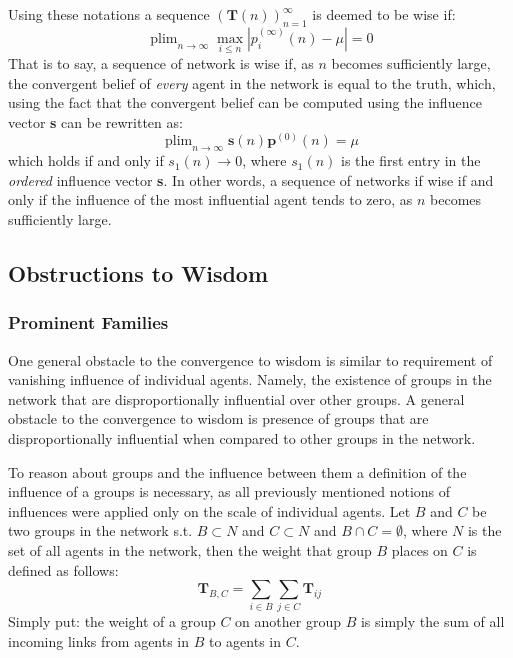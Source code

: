 \documentclass{article}
\DeclareMathOperator*{\plim}{plim}
\newcommand{\T}{\textbf{T}}
\newcommand{\Tij}{\textbf{T}_{ij}}
\newcommand{\Soc}{(\T(n))^{\infty}_{n=1}}
\newcommand{\beli}[3][2]{p_{#2}^{(#3)}}
\begin{document}
Using these notations a sequence $\Soc$ is deemed to be wise if:
\begin{equation}
    \label{wisdom:equation}
    \plim_{n\to\infty}\max_{i \leq n}|\beli{i}{\infty}(n) - \mu| = 0
\end{equation}
That is to say, a sequence of network is wise if, as $n$ becomes sufficiently large, the convergent belief of \emph{every} agent in the network is equal to the truth, which, using the fact that the convergent belief can be computed using the influence vector \textbf{s} can be rewritten as:
\begin{equation}
    \label{wisdom:influence}
    \plim_{n\to\infty} \textbf{s}(n)\textbf{p}^{(0)}(n) = \mu
\end{equation}
which holds if and only if $s_{1}(n) \to 0$, where $s_1(n)$ is the first entry in the \emph{ordered} influence vector \textbf{s}. In other words, a sequence of networks if wise if and only if the influence of the most influential agent tends to zero, as $n$ becomes sufficiently large.

\newpage

\subsection{Obstructions to Wisdom}

\subsubsection{Prominent Families}

One general obstacle to the convergence to wisdom is similar to requirement of vanishing influence of individual agents. Namely, the existence of groups in the network that are disproportionally influential over other groups.
A general obstacle to the convergence to wisdom is presence of groups that are disproportionally influential when compared to other groups in the network.

To reason about groups and the influence between them a definition of the influence of a groups is necessary, as all previously mentioned notions of influences were applied only on the scale of individual agents. Let $B$ and $C$ be two groups in the network s.t. $B \subset N$ and $C \subset N$ and $B \cap C = \emptyset$, where $N$ is the set of all agents in the network, then the weight that group $B$ places on $C$ is defined as follows:
\begin{equation}
    \textbf{T}_{B, C} = \sum_{i\in B}\sum_{j \in C} \Tij
\end{equation}
Simply put: the weight of a group $C$ on another group $B$ is simply the sum of all incoming links from agents in $B$ to agents in $C$.
\end{document}
